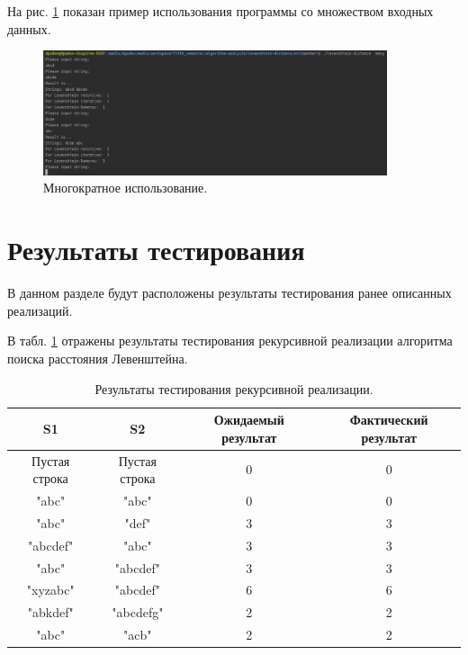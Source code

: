 На рис. \ref{screenshot-many} показан пример использования программы со множеством входных данных.

\begin{figure}
    \includegraphics[width=0.9\textwidth]{screenshots/screenshot-many}
    \caption{Многократное использование.}
    \label{screenshot-many}
\end{figure}

\FloatBarrier

\section{Результаты тестирования}

В данном разделе будут расположены результаты тестирования ранее описанных
реализаций.

В табл. \ref{table-testing-results-recursive} отражены результаты тестирования рекурсивной
реализации алгоритма поиска расстояния Левенштейна.

\begin{table}
    \caption{Результаты тестирования рекурсивной реализации.}
    \label{table-testing-results-recursive}
    \begin{center}
        \begin{tabular}{|c|c|c|c|}
            \hline
            S1 & S2 & Ожидаемый результат & Фактический результат \\
            \hline
            Пустая строка & Пустая строка & 0 & 0\\
            \hline
            "abc" & "abc" & 0 & 0\\
            \hline
            "abc" & "def" & 3 & 3\\
            \hline
            "abcdef" & "abc" & 3 & 3\\
            \hline
            "abc" & "abcdef" & 3 & 3\\
            \hline
            "xyzabc" & "abcdef" & 6 & 6\\
            \hline
            "abkdef" & "abcdefg" & 2 & 2\\
            \hline
            "abc" & "acb" & 2 & 2\\
            \hline
        \end{tabular}
    \end{center}
\end{table}

